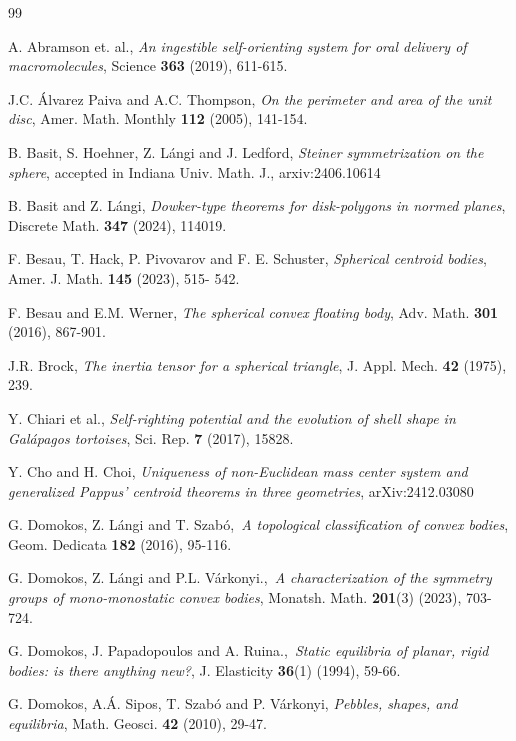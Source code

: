 \documentclass[twoside]{amsart}
\theoremstyle{plain}
\theoremstyle{definition}
\numberwithin{equation}{section}
\begin{document}
\begin{thebibliography}{99}

 A. Abramson et. al., \emph{An ingestible self-orienting system for oral delivery of macromolecules}, Science \textbf{363} (2019), 611-615.

  J.C. \'Alvarez Paiva and A.C. Thompson, \emph{On the perimeter and area of the unit disc}, Amer. Math. Monthly \textbf{112} (2005), 141-154.

 B. Basit, S. Hoehner, Z. Lángi and J. Ledford, \emph{Steiner symmetrization on the sphere}, accepted in Indiana Univ. Math. J., arxiv:2406.10614

 B. Basit and Z. L\'angi, \emph{Dowker-type theorems for disk-polygons in normed planes}, Discrete Math. \textbf{347} (2024), 114019.

 F. Besau, T. Hack, P. Pivovarov and F. E. Schuster, \emph{Spherical centroid bodies}, Amer. J. Math. \textbf{145} (2023), 515-
542.

 F. Besau and E.M. Werner, \emph{The spherical convex floating body}, Adv. Math. \textbf{301} (2016), 867-901.

 J.R. Brock, \emph{The inertia tensor for a spherical triangle}, J. Appl. Mech. \textbf{42} (1975), 239.

 Y. Chiari et al., \emph{Self-righting potential and the evolution of shell shape in {G}al{\'a}pagos tortoises}, Sci. Rep. \textbf{7} (2017), 15828.

 Y. Cho and H. Choi, \emph{Uniqueness of non-Euclidean mass center system and generalized Pappus' centroid theorems in three geometries}, arXiv:2412.03080

 G. Domokos, Z. L\'angi and T. Szab\'o,~\emph{A topological classification of convex bodies}, Geom. Dedicata \textbf{182} (2016), 95-116.

 G. Domokos, Z. L\'angi and P.L. V\'arkonyi.,~\emph{A characterization of the symmetry
groups of mono-monostatic convex bodies}, Monatsh. Math. \textbf{201}(3) (2023), 703-724.

 G. Domokos, J. Papadopoulos and A. Ruina.,~\emph{Static equilibria of planar, rigid bodies: is there anything new?}, J. Elasticity \textbf{36}(1) (1994), 59-66.

 G. Domokos, A.\'A. Sipos, T. Szab\'o and P. V\'arkonyi, \emph{Pebbles, shapes, and equilibria}, Math. Geosci. \textbf{42} (2010), 29-47.


\end{thebibliography}
\end{document}
